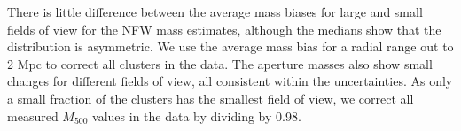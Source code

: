 \documentclass[useAMS,usenatbib]{mnras}
\begin{document}
There is little difference between the average mass biases for large and small fields of view for the NFW mass estimates, although the medians show that the distribution is asymmetric. We use the average mass bias for a radial range out to 2 Mpc to correct all clusters in the data. The aperture masses also show small changes for different fields of view, all consistent within the uncertainties. As only a small fraction of the clusters has the smallest field of view, we correct all measured $M_{500}$ values in the data by dividing by 0.98.





\label{lastpage}
\end{document}
